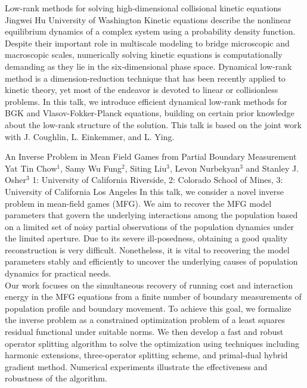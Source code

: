 \begin{addmargin}[2em]{0em}
\vspace{1.5ex}
\abs
{Low-rank methods for solving high-dimensional collisional kinetic equations}
{Jingwei Hu}
{University of Washington}
{Kinetic equations describe the nonlinear equilibrium dynamics of a complex system using a probability density function. Despite their important role in multiscale modeling to bridge microscopic and macroscopic scales, numerically solving kinetic equations is computationally demanding as they lie in the six-dimensional phase space. Dynamical low-rank method is a dimension-reduction technique that has been recently applied to kinetic theory, yet most of the endeavor is devoted to linear or collisionless problems. In this talk, we introduce efficient dynamical low-rank methods for BGK and Vlasov-Fokker-Planck equations, building on certain prior knowledge about the low-rank structure of the solution. This talk is based on the joint work with J. Coughlin, L. Einkemmer, and L. Ying.}


\vspace{1.5ex}
\abs
{An Inverse Problem in Mean Field Games from Partial Boundary Measurement}
{Yat Tin Chow$^1$, Samy Wu Fung$^2$, Siting Liu$^3$, Levon Nurbekyan$^3$ and Stanley J. Osher$^3$}
{1: University of California Riverside, 2: Colorado School of Mines, 3: University of California Los Angeles}
{In this talk, we consider a novel inverse problem in mean-field games (MFG). We aim to recover the MFG model parameters that govern the underlying interactions among the population based on a limited set of noisy partial observations of the population dynamics under the limited aperture. Due to its severe ill-posedness, obtaining a good quality reconstruction is very difficult. Nonetheless, it is vital to recovering the model parameters stably and efficiently to uncover the underlying causes of population dynamics for practical needs.\\
Our work focuses on the simultaneous recovery of running cost and interaction energy in the MFG equations from a finite number of boundary measurements of population profile and boundary movement. To achieve this goal, we formalize the inverse problem as a constrained optimization problem of a least squares residual functional under suitable norms. We then develop a fast and robust operator splitting algorithm to solve the optimization using techniques including harmonic extensions, three-operator splitting scheme, and primal-dual hybrid gradient method. Numerical experiments illustrate the effectiveness and robustness of the algorithm.}



\end{addmargin}
